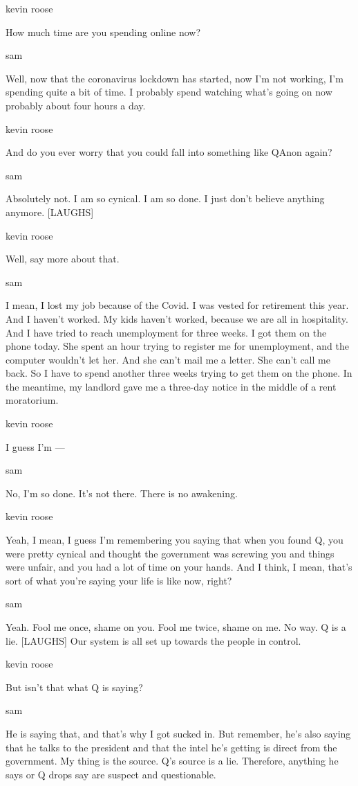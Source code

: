 kevin roose

How much time are you spending online now?

sam

Well, now that the coronavirus lockdown has started, now I'm not
working, I'm spending quite a bit of time. I probably spend watching
what's going on now probably about four hours a day.

kevin roose

And do you ever worry that you could fall into something like QAnon
again?

sam

Absolutely not. I am so cynical. I am so done. I just don't believe
anything anymore. {[}LAUGHS{]}

kevin roose

Well, say more about that.

sam

I mean, I lost my job because of the Covid. I was vested for retirement
this year. And I haven't worked. My kids haven't worked, because we are
all in hospitality. And I have tried to reach unemployment for three
weeks. I got them on the phone today. She spent an hour trying to
register me for unemployment, and the computer wouldn't let her. And she
can't mail me a letter. She can't call me back. So I have to spend
another three weeks trying to get them on the phone. In the meantime, my
landlord gave me a three-day notice in the middle of a rent moratorium.

kevin roose

I guess I'm ---

sam

No, I'm so done. It's not there. There is no awakening.

kevin roose

Yeah, I mean, I guess I'm remembering you saying that when you found Q,
you were pretty cynical and thought the government was screwing you and
things were unfair, and you had a lot of time on your hands. And I
think, I mean, that's sort of what you're saying your life is like now,
right?

sam

Yeah. Fool me once, shame on you. Fool me twice, shame on me. No way. Q
is a lie. {[}LAUGHS{]} Our system is all set up towards the people in
control.

kevin roose

But isn't that what Q is saying?

sam

He is saying that, and that's why I got sucked in. But remember, he's
also saying that he talks to the president and that the intel he's
getting is direct from the government. My thing is the source. Q's
source is a lie. Therefore, anything he says or Q drops say are suspect
and questionable.

